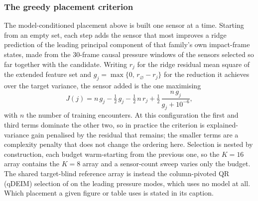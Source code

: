\subsubsection*{The greedy placement criterion}
\label{app:osp}

The model-conditioned placement above is built one sensor at a time. Starting
from an empty set, each step adds the sensor that most improves a ridge
prediction of the leading principal component of that family's own impact-frame
states, made from the $30$-frame causal pressure windows of the sensors selected
so far together with the candidate. Writing $r_j$ for the ridge residual mean
square of the extended feature set and $g_j = \max\{0,\, r_\varnothing - r_j\}$
for the reduction it achieves over the target variance, the sensor added is the
one maximising
\begin{equation}
  J(j) = n\,g_j - \tfrac{1}{2}\,g_j - \tfrac{1}{2}\,n\,r_j
  + \tfrac{1}{2}\,\frac{n\,g_j}{g_j + 10^{-6}},
  \label{eq:osp}
\end{equation}
with $n$ the number of training encounters. At this configuration the first and
third terms dominate the other two, so in practice the criterion is
explained-variance gain penalised by the residual that remains; the smaller
terms are a complexity penalty that does not change the ordering here. Selection
is nested by construction, each budget warm-starting from the previous one, so
the $K = 16$ array contains the $K = 8$ array and a sensor-count sweep varies
only the budget. The shared target-blind reference array is instead the
column-pivoted QR (qDEIM) selection of \citet{drmac2016qdeim} on the leading
pressure modes, which uses no model at all. Which placement a given figure or
table uses is stated in its caption.\re


